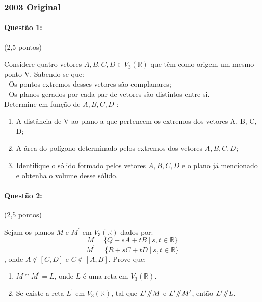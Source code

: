 \documentclass[12pt,a4paper]{article}
\newcommand{\parallelsum}{\mathbin{\!/\mkern-5mu/\!}}
\newcommand{\original}[1]{\tiny \href{#1}{Original} \normalsize}
\begin{document}
\newpage
\subsubsection{2003 \original{https://drive.google.com/file/d/1t1wd-XWCXO2ECK6n3p2MlNog4TR39LUJ/view?usp=sharing}}

\paragraph{Questão 1:} (2,5 pontos)

Considere quatro vetores $A,B,C,D \in V_3(\mathbb{R})$  que têm como origem um mesmo ponto V. Sabendo-se que: \\
- Os pontos extremos desses vetores são complanares;\\
- Os planos gerados por cada par de vetores são distintos entre si.\\

Determine em função de $A, B, C, D$ :
\begin{enumerate}[label=(\alph*)]
\item A distância de V ao plano a que pertencem os extremos dos vetores A, B, C, D;
\item A área do polígono determinado pelos extremos dos vetores $A, B, C, D$;
\item Identifique o sólido formado pelos vetores $A, B, C, D$ e o plano já mencionado e
obtenha o volume desse sólido.
\end{enumerate}

\paragraph{Questão 2:} (2,5 pontos)

Sejam os planos $M$ e $M^\prime$ em $V_3(\mathbb{R})$ dados por:
$$M=\{Q+sA+tB \ | \ s,t \in \mathbb{R}\}$$
$$M^\prime = \{R+sC+tD \ | \ s,t \in \mathbb{R} \}$$
, onde $ A \notin [C,D]$ e $ C \notin [A,B]$. Prove que:

\begin{enumerate}[label=(\alph*)]

\item $M\cap M^\prime=L$, onde $L$ é uma reta em $V_3(\mathbb{R})$.

\item Se existe a reta $L^\prime$ em $V_3(\mathbb{R})$, tal que $L^\prime \parallelsum M$ e $L^\prime \parallelsum M^\prime$, então $L^\prime  \parallelsum L$.

\end{enumerate}
\end{document}
